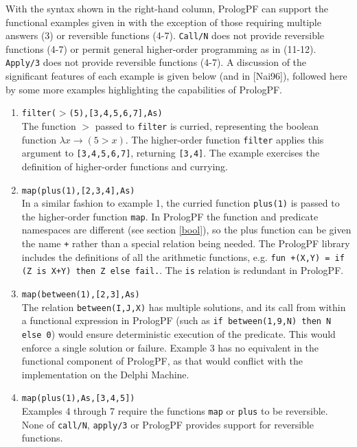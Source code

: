 With the syntax shown in the right-hand column, PrologPF can support the 
functional examples given in \cite{Nai96} with the exception of those requiring
multiple answers (3) or reversible functions (4-7).  \texttt{Call/N} does not
provide reversible functions (4-7) or permit general higher-order programming
as in (11-12).  \texttt{Apply/3} does not provide reversible functions (4-7).
A discussion of the significant features of each example is given below
(and in [Nai96]), followed here
by some more examples highlighting the capabilities of PrologPF.

\begin{enumerate}
\item{\texttt{filter($>$(5),[3,4,5,6,7],As)}\\
  The function $>$ passed to \texttt{filter} is curried, representing the 
  boolean function $\lambda x \rightarrow (5 > x)$.  The higher-order function
  \texttt{filter} applies this argument to \texttt{[3,4,5,6,7]}, returning
  \texttt{[3,4]}.  The example exercises the definition of higher-order functions
  and currying.}
\item{\texttt{map(plus(1),[2,3,4],As)}\\
  In a similar fashion to example 1, the curried function \texttt{plus(1)} is
  passed to the higher-order function \texttt{map}.  In PrologPF the function and
  predicate namespaces are different (see section \ref{bool}), so the plus function
  can be given the name \texttt{+} rather than a special relation being needed.  The
  PrologPF library includes the definitions of all the arithmetic functions, e.g.
  \mbox{\texttt{fun +(X,Y) = if (Z is X+Y) then Z else fail.}}.  The \texttt{is}
  relation is redundant in PrologPF.}
\item{\texttt{map(between(1),[2,3],As)}\\
  The relation \texttt{between(I,J,X)} has multiple solutions, and its call
  from within a functional expression in PrologPF (such as 
  \mbox{\texttt{if between(1,9,N) then N else 0}}) would ensure deterministic execution of
  the predicate.  This would enforce a single solution or failure.  Example 3 has no
  equivalent in the functional component of PrologPF, as that would conflict with
  the implementation on the Delphi Machine.}
\item{\texttt{map(plus(1),As,[3,4,5])}\\
  Examples 4 through 7 require the functions \texttt{map} or \texttt{plus}
  to be reversible.  None of \texttt{call/N}, \texttt{apply/3} or PrologPF
  provides support for reversible functions.}

\end{enumerate}
